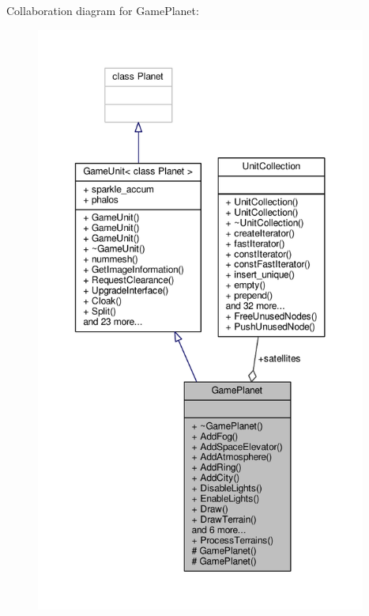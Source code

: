 Collaboration diagram for Game\+Planet\+:
\nopagebreak
\begin{figure}[H]
\begin{center}
\leavevmode
\includegraphics[height=550pt]{de/d7b/classGamePlanet__coll__graph}
\end{center}
\end{figure}
